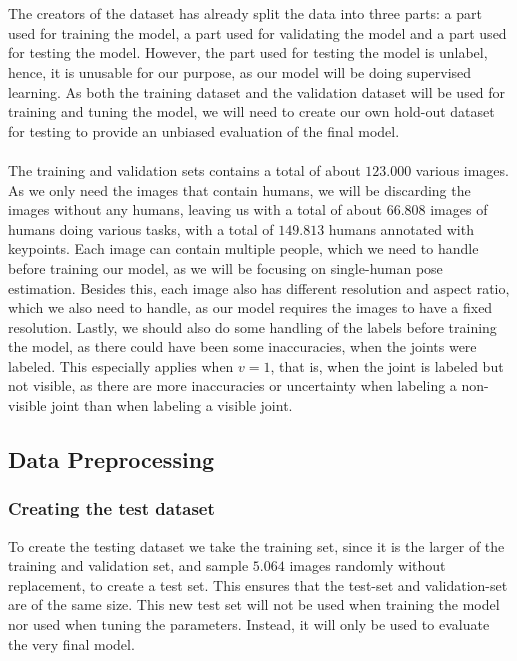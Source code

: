 \documentclass[./main.tex]{subfiles}
\begin{document}
\\
\\
The creators of the dataset has already split the data into three parts: a part used for training the model, a part used for validating the model and a part used for testing the model. However, the part used for testing the model is unlabel, hence, it is unusable for our purpose, as our model will be doing supervised learning. As both the training dataset and the validation dataset will be used for training and tuning the model, we will need to create our own hold-out dataset for testing to provide an unbiased evaluation of the final model. 
\\
\\
The training and validation sets contains a total of about $123.000$ various images. As we only need the images that contain humans, we will be discarding the images without any humans, leaving us with a total of about $66.808$ images of humans doing various tasks, with a total of $149.813$ humans annotated with keypoints. Each image can contain multiple people, which we need to handle before training our model, as we will be focusing on single-human pose estimation. Besides this, each image also has different resolution and aspect ratio, which we also need to handle, as our model requires the images to have a fixed resolution. Lastly, we should also do some handling of the labels before training the model, as there could have been some inaccuracies, when the joints were labeled. This especially applies when $v = 1$, that is, when the joint is labeled but not visible, as there are more inaccuracies or uncertainty when labeling a non-visible joint than when labeling a visible joint.

\subsection{Data Preprocessing}\label{subsec:data_preprocessing}
\subsubsection{Creating the test dataset}
To create the testing dataset we take the training set, since it is the larger of the training and validation set, and sample $5.064$ images randomly without replacement, to create a test set. This ensures that the test-set and validation-set are of the same size. This new test set will not be used when training the model nor used when tuning the parameters. Instead, it will only be used to evaluate the very final model. 
\end{document}
